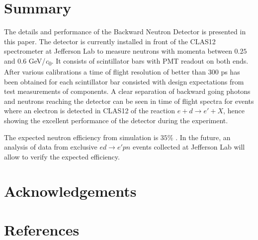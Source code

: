 \documentclass[3p,final,twocolumn]{elsarticle}
\begin{document}
{%

\section{Summary}
The details and performance of the Backward Neutron Detector is presented in this paper. The detector is currently installed in front of the CLAS12 spectrometer at Jefferson Lab to measure neutrons with momenta between $0.25$ and $0.6$ \si{\GeV/\clight}.  It consists of scintillator bars with PMT readout on both ends.
After various calibrations a time of flight resolution of better than 300 \si{\pico\s} has been obtained for each scintillator bar consisted with design expectations from test measurements of components. A clear separation of backward going photons and neutrons reaching the detector can be seen in time of flight spectra for events where an electron is detected in CLAS12 of the reaction $e+d \rightarrow e'+X$, hence showing the excellent performance of the detector during the experiment.

The expected neutron efficiency from simulation is $35$\% . In the future, an analysis of data from exclusive $ed \rightarrow e'pn$ events collected at Jefferson Lab will allow to verify the expected efficiency.


\section{Acknowledgements}



\section*{References}



 
 \clearpage




}
\end{document}
